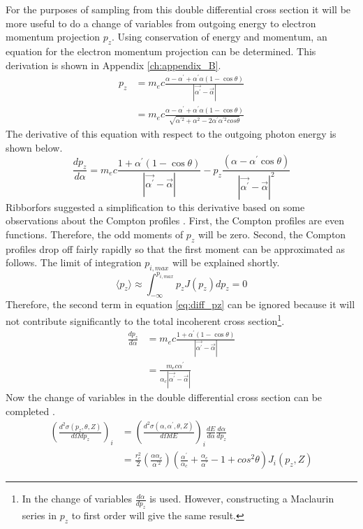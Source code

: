 For the purposes of sampling from this double differential cross section it
will be more useful to do a change of variables from outgoing energy to 
electron momentum projection $p_z$. Using conservation of energy and momentum,
an equation for the electron momentum projection can be determined. This
derivation is shown in Appendix \ref{ch:appendix_B}. 
\begin{align}
  p_z & = m_ec \frac{\alpha - \alpha^{'} + \alpha^{'}\alpha(1 - \cos{\theta})}
  {\left|\vec{\alpha^{'}} - \vec{\alpha}\right|} \nonumber \\
  & = m_ec \frac{\alpha - \alpha^{'} + \alpha^{'}\alpha(1 - \cos{\theta})}
  {\sqrt{\alpha^{'2} + \alpha^{2} - 2\alpha^{'}\alpha^{'2}cos{\theta}}}
  \label{eq:pz}
\end{align}
The derivative of this equation with respect to the outgoing photon energy
is shown below.
\begin{equation}
  \frac{dp_z}{d\alpha} = m_ec \frac{1 + \alpha^{'}(1-\cos{\theta})}
  {\left|\vec{\alpha^{'}} - \vec{\alpha} \right|} - 
  p_z \frac{\left(\alpha - \alpha^{'}\cos{\theta} \right)}
  {\left|\vec{\alpha^{'}} - \vec{\alpha} \right|^2}
  \label{eq:diff_pz}
\end{equation}
Ribborfors suggested a simplification to this derivative based on some 
observations about the Compton profiles \citep{ribberfors_x-ray_1983}. First, 
the Compton profiles are even functions. Therefore, the odd moments of $p_z$ 
will be zero. Second, the Compton profiles drop off fairly rapidly so that
the first moment can be approximated as follows. The limit of integration
$p_{i,max}$ will be explained shortly.
\begin{equation}
  \langle p_z \rangle \approx \int_{-\infty}^{p_{i,max}} p_z J(p_z)dp_z = 0
\end{equation}
Therefore, the second term in equation \ref{eq:diff_pz} can be ignored because
it will not contribute significantly to the total incoherent cross section\footnote{In the change of variables $\frac{d\alpha}{dp_z}$ is used. However, 
constructing a Maclaurin series in $p_z$ to first order will give the same result.}.
\begin{align}
  \frac{dp_z}{d\alpha} & = m_ec \frac{1 + \alpha^{'}(1-\cos{\theta})}
  {\left|\vec{\alpha^{'}} - \vec{\alpha} \right|} \nonumber \\
  & = \frac{m_ec \alpha^{'}}
  {\alpha_c \left|\vec{\alpha^{'}} - \vec{\alpha} \right|}
  \label{eq:diff_pz_simp}
\end{align}
Now the change of variables in the double differential cross section can be
completed \citep{ribberfors_x-ray_1983}.
\begin{align}
  \left(\frac{d^2\sigma(p_z,\theta,Z)}{d\Omega dp_z}\right)_i & = 
  \left(\frac{d^2\sigma(\alpha,\alpha^{'},\theta,Z)}{d\Omega dE}\right)_i 
  \frac{dE}{d\alpha}
  \frac{d\alpha}{dp_z} \nonumber \\ 
  & =  \frac{r_e^2}{2} \left(\frac{\alpha\alpha_c}{\alpha^{'2}}\right) 
  \left(\frac{\alpha^{'}}{\alpha_c} + \frac{\alpha_c}{\alpha^{'}} - 1 + 
  cos^2\theta \right) J_i(p_z,Z)
\end{align}

